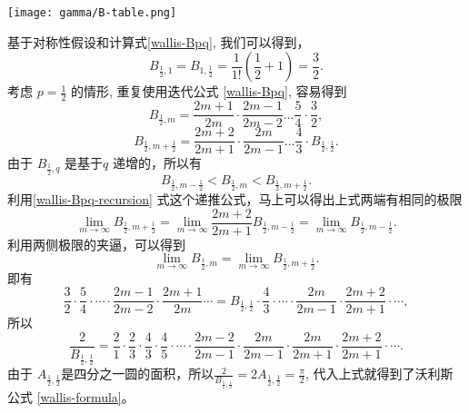 {\begin{table}[htb]
\centering
\caption{\label{B-table} $B_{pq}$ 数值表}
\texttt{[image: gamma/B-table.png]}
\end{table}

基于对称性假设和计算式\eqref{wallis-Bpq}, 我们可以得到，
$$ B_{\frac{1}{2}, 1} =  B_{1, \frac{1}{2}} = \frac{1}{1!}(\frac{1}{2} + 1)  =  \frac{3}{2} .$$
考虑 $p=\frac{1}{2}$ 的情形, 重复使用迭代公式 \eqref{wallis-Bpq}, 容易得到
$$ B_{\frac{1}{2}, m} = \frac{2m+1}{2m}\cdot \frac{2m-1}{2m-2} \ldots \frac{5}{4} \cdot\frac{3}{2} ,$$
$$ B_{\frac{1}{2}, m+\frac{1}{2}} = \frac{2m+2}{2m+1} \cdot\frac{2m}{2m-1} \ldots \frac{4}{3} 
\cdot B_{\frac{1}{2}, \frac{1}{2}} . $$
由于 $B_{\frac{1}{2}, q}$  是基于$q$ 递增的，所以有
$$ B_{\frac{1}{2}, m-\frac{1}{2}} < B_{\frac{1}{2}, m}  < B_{\frac{1}{2}, m+\frac{1}{2}}  .$$
利用\eqref{wallis-Bpq-recursion} 式这个递推公式，马上可以得出上式两端有相同的极限
$$ \lim_{m \rightarrow \infty} B_{\frac{1}{2}, m+\frac{1}{2}} 
= \lim_{m \rightarrow \infty} \frac{2m+2}{2m+1}  B_{\frac{1}{2}, m-\frac{1}{2}} 
= \lim_{m \rightarrow \infty} B_{\frac{1}{2}, m-\frac{1}{2}} .
$$  
利用两侧极限的夹逼，可以得到
$$ \lim_{m \rightarrow \infty} B_{\frac{1}{2}, m} = \lim_{m \rightarrow \infty} B_{\frac{1}{2}, m+\frac{1}{2}}  .$$
即有
$$ 
\frac{3}{2} \cdot \frac{5}{4} \cdot \cdots \cdot \frac{2m-1}{2m-2} \cdot \frac{2m+1}{2m} \cdots 
= B_{\frac{1}{2}, \frac{1}{2}} \cdot \frac{4}{3} \cdot \cdots \cdot \frac{2m}{2m-1} \cdot  \frac{2m+2}{2m+1} \cdot \cdots ,
$$
所以
$$ 
\frac{2}{B_{\frac{1}{2}, \frac{1}{2}}} = \frac{2}{1} \cdot\frac{2}{3} \cdot\frac{4}{3}\cdot \frac{4}{5}\cdot
\cdots \cdot \frac{2m-2}{2m-1}\cdot \frac{2m}{2m-1} \cdot \frac{2m}{2m+1} \cdot \frac{2m+2}{2m+1} \cdot\cdots .
$$
由于 $A_{\frac{1}{2}, \frac{1}{2}} $是四分之一圆的面积，所以$\displaystyle
\frac{2}{B_{\frac{1}{2}, \frac{1}{2}}} = 2A_{\frac{1}{2}, \frac{1}{2}} =
\frac{\pi}{2} $, 代入上式就得到了沃利斯公式 \eqref{wallis-formula}。

}
